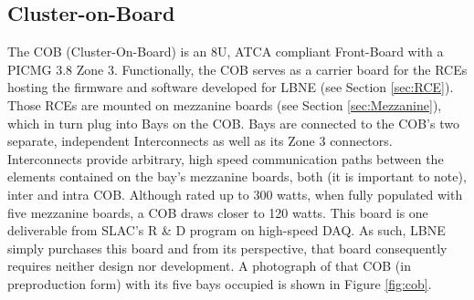

\subsection{Cluster-on-Board}
\label{sec:COB}
The COB (Cluster-On-Board) is an 8U, ATCA compliant Front-Board with a PICMG 3.8 Zone 3. Functionally, the COB serves as a carrier board for the RCEs hosting the firmware and software developed for LBNE (see Section \ref{sec:RCE}). Those RCEs are mounted on mezzanine boards (see Section \ref{sec:Mezzanine}), which in turn plug into Bays on the COB. Bays are connected to the COB's two separate, independent Interconnects as well as its Zone 3 connectors. Interconnects provide arbitrary, high speed communication paths between the elements contained on the bay's mezzanine boards, both (it is important to note), inter and intra COB.
Although rated up to 300 watts, when fully populated with five mezzanine boards, a COB draws closer to 120 watts. This board is one deliverable from SLAC's R \& D program on high-speed DAQ. As such, LBNE simply purchases this board and from its perspective, that board consequently requires neither design nor development. A photograph of that COB (in preproduction form) with its five bays occupied is shown in Figure \ref{fig:cob}.


